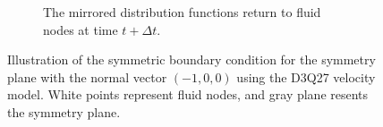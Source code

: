 \begin{figure}[H]
\begin{subfigure}{0.47\textwidth}
			\caption{The mirrored distribution functions return to fluid nodes at time $t + \Delta t$.}
			\label{fig:sym b}
	\end{subfigure}
	\vspace{2mm}
	\caption{Illustration of the symmetric boundary condition for the symmetry plane with the normal vector \( (-1, 0, 0) \) using the D3Q27 velocity model. White points represent fluid nodes, and gray plane resents the symmetry plane.}
	\label{fig:symmetric bc}

\end{figure}